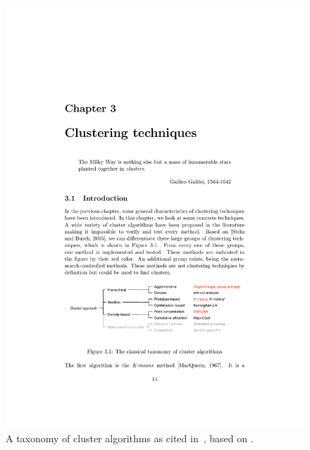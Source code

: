 \begin{figure}[h]
  \begin{center}
    \includegraphics[width=1\textwidth]{figures/clustering_techniques_meert.pdf}
    \caption{A taxonomy of cluster algorithms as cited in~\cite[p 14]{Meert06clustermaps}, based on \cite{Stein05density}.}
    \label{fig:clusters}
  \end{center}
\end{figure}

